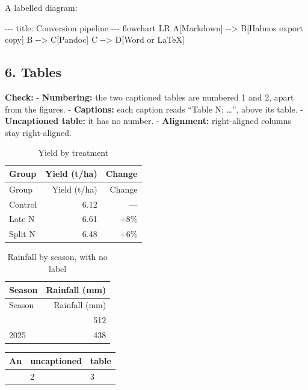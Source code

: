 \documentclass[
]{article}
\newenvironment{Shaded}{}{}
\newcommand{\NormalTok}[1]{#1}
\newcounter{none} %
\begin{document}
A labelled diagram:

\protect{}\label{fig:pipeline}%
\begin{Shaded}
\begin{Highlighting}[]
\NormalTok{{-}{-}{-}}
\NormalTok{title: Conversion pipeline}
\NormalTok{{-}{-}{-}}
\NormalTok{flowchart LR}
\NormalTok{  A[Markdown] {-}{-}\textgreater{} B[Halmos export copy]}
\NormalTok{  B {-}{-}\textgreater{} C[Pandoc]}
\NormalTok{  C {-}{-}\textgreater{} D[Word or LaTeX]}
\end{Highlighting}
\end{Shaded}

\subsection{6. Tables}\label{tables}

\textbf{Check:} - \textbf{Numbering:} the two captioned tables are
numbered 1 and 2, apart from the figures. - \textbf{Captions:} each
caption reads ``Table N: \ldots{}'', above its table. -
\textbf{Uncaptioned table:} it has no number. - \textbf{Alignment:}
right-aligned columns stay right-aligned.

\begin{longtable}[]{@{}lrr@{}}
\caption{Yield by treatment}\label{tbl:yield}\tabularnewline
\toprule\noalign{}
Group & Yield (t/ha) & Change \\
\midrule\noalign{}
\endfirsthead
\toprule\noalign{}
Group & Yield (t/ha) & Change \\
\midrule\noalign{}
\endhead
\bottomrule\noalign{}
\endlastfoot
Control & 6.12 & --- \\
Late N & 6.61 & +8\% \\
Split N & 6.48 & +6\% \\
\end{longtable}

\begin{longtable}[]{@{}lr@{}}
\caption{Rainfall by season, with no
label}\label{tbl:halmos-1}\tabularnewline
\toprule\noalign{}
Season & Rainfall (mm) \\
\midrule\noalign{}
\endfirsthead
\toprule\noalign{}
Season & Rainfall (mm) \\
\midrule\noalign{}
\endhead
\bottomrule\noalign{}
\endlastfoot
2024 & 512 \\
2025 & 438 \\
\end{longtable}

{\def\LTcaptype{none} %
\begin{longtable}[]{@{}lll@{}}
\toprule\noalign{}
An & uncaptioned & table \\
\midrule\noalign{}
\endhead
\bottomrule\noalign{}
\endlastfoot
1 & 2 & 3 \\
\end{longtable}
}
\end{document}
